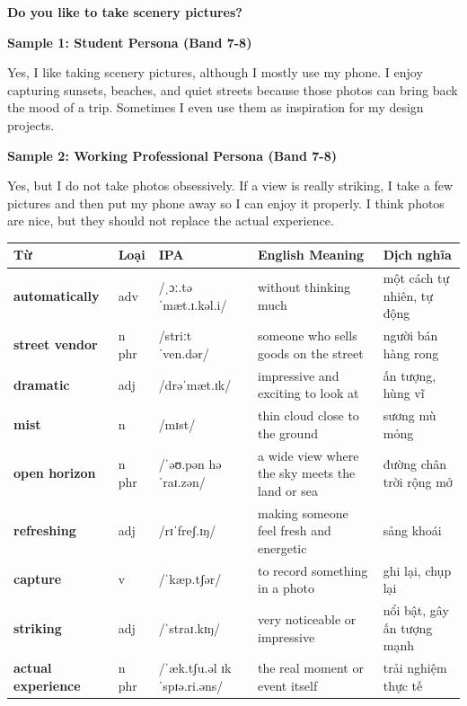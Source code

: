 \separator

\begin{ieltsquestion}
\textbf{Do you like to take scenery pictures?}
\end{ieltsquestion}
\textbf{Sample 1: Student Persona (Band 7-8)}

Yes, I like taking scenery pictures, although I mostly use my phone. I enjoy capturing sunsets, beaches, and quiet streets because those photos can bring back the mood of a trip. Sometimes I even use them as inspiration for my design projects.

\textbf{Sample 2: Working Professional Persona (Band 7-8)}

Yes, but I do not take photos obsessively. If a view is really striking, I take a few pictures and then put my phone away so I can enjoy it properly. I think photos are nice, but they should not replace the actual experience.

\separator


\vspace{0.8em}
\begin{center}
\renewcommand{\arraystretch}{1.65}
\begin{tabularx}{\textwidth}{|V{0.22\textwidth}|C{0.07\textwidth}|I{0.20\textwidth}|Y|V{0.18\textwidth}|}
\hline
{}
\textbf{Từ} & \textbf{Loại} & \textbf{IPA} & \textbf{English Meaning} & \textbf{Dịch nghĩa} \\
\hline
\textbf{automatically} & adv & /ˌɔː.təˈmæt.ɪ.kəl.i/ & without thinking much & một cách tự nhiên, tự động \\ \hline
\textbf{street vendor} & n phr & /striːt ˈven.dər/ & someone who sells goods on the street & người bán hàng rong \\ \hline
\textbf{dramatic} & adj & /drəˈmæt.ɪk/ & impressive and exciting to look at & ấn tượng, hùng vĩ \\ \hline
\textbf{mist} & n & /mɪst/ & thin cloud close to the ground & sương mù mỏng \\ \hline
\textbf{open horizon} & n phr & /ˈəʊ.pən həˈraɪ.zən/ & a wide view where the sky meets the land or sea & đường chân trời rộng mở \\ \hline
\textbf{refreshing} & adj & /rɪˈfreʃ.ɪŋ/ & making someone feel fresh and energetic & sảng khoái \\ \hline
\textbf{capture} & v & /ˈkæp.tʃər/ & to record something in a photo & ghi lại, chụp lại \\ \hline
\textbf{striking} & adj & /ˈstraɪ.kɪŋ/ & very noticeable or impressive & nổi bật, gây ấn tượng mạnh \\ \hline
\textbf{actual experience} & n phr & /ˈæk.tʃu.əl ɪkˈspɪə.ri.əns/ & the real moment or event itself & trải nghiệm thực tế \\ \hline
\end{tabularx}
\end{center}


